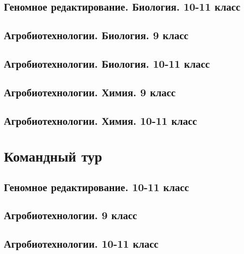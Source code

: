 \documentclass[a4paper,12pt,oneside]{book}
\begin{document}
\section{Геномное редактирование. Биология. 10-11 класс}


\section{Агробиотехнологии. Биология. 9 класс}


\section{Агробиотехнологии. Биология. 10-11 класс}


\section{Агробиотехнологии. Химия. 9 класс}


\section{Агробиотехнологии. Химия. 10-11 класс}



\chapter{Командный тур}
\section{Геномное редактирование. 10-11 класс}


\section{Агробиотехнологии. 9 класс} 



\section{Агробиотехнологии. 10-11 класс}




\end{document}
